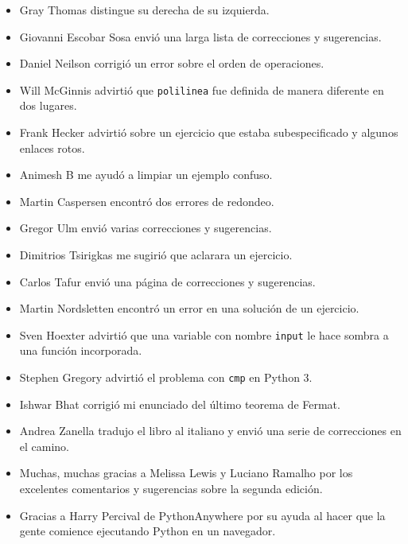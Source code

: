 \documentclass[10pt]{book}
\begin{document}
\begin{itemize}
\item Gray Thomas distingue su derecha de su izquierda.

\item Giovanni Escobar Sosa envió una larga lista de correcciones y
sugerencias.

\item Daniel Neilson corrigió un error sobre el orden de operaciones.

\item Will McGinnis advirtió que {\tt polilinea} fue definida
de manera diferente en dos lugares.

\item Frank Hecker advirtió sobre un ejercicio que estaba subespecificado y
algunos enlaces rotos.

\item Animesh B me ayudó a limpiar un ejemplo confuso.

\item Martin Caspersen encontró dos errores de redondeo.

\item Gregor Ulm envió varias correcciones y sugerencias.

\item Dimitrios Tsirigkas me sugirió que aclarara un ejercicio.

\item Carlos Tafur envió una página de correcciones y sugerencias.

\item Martin Nordsletten encontró un error en una solución de un ejercicio.

\item Sven Hoexter advirtió que una variable con nombre {\tt input}
le hace sombra a una función incorporada.

\item Stephen Gregory advirtió el problema con {\tt cmp}
en Python 3.

\item Ishwar Bhat corrigió mi enunciado del último teorema de Fermat.

\item Andrea Zanella tradujo el libro al italiano y envió una
serie de correcciones en el camino.

\item Muchas, muchas gracias a Melissa Lewis y Luciano Ramalho por
  los excelentes comentarios y sugerencias sobre la segunda edición.

\item Gracias a Harry Percival de PythonAnywhere por su ayuda
al hacer que la gente comience ejecutando Python en un navegador.


\end{itemize}
\end{document}
